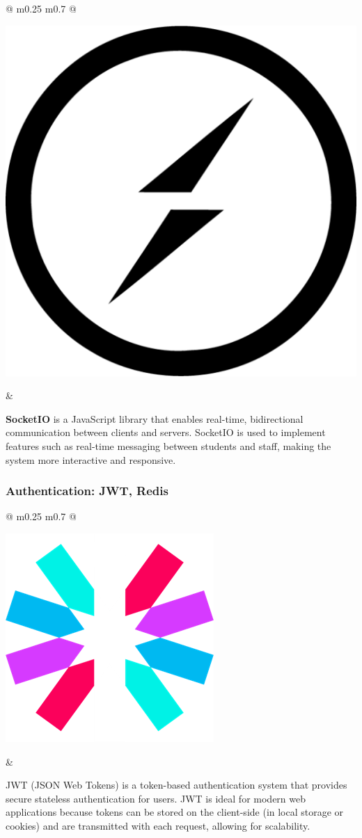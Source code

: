 	\vspace*{0.5cm}
	\begin{tabular}{ @{} m{0.25\textwidth} m{0.7\textwidth} @{} }
		\begin{minipage}{\linewidth}
			\centering
			\includegraphics[width=0.45\linewidth]{graphics/socket-io.512x512.png}
			\label{fig:socketio}
		\end{minipage}
		&
		\begin{minipage}{\linewidth}
			\textbf{SocketIO} is a JavaScript library that enables real-time, bidirectional communication between clients and servers. SocketIO is used to implement features such as real-time messaging between students and staff, making the system more interactive and responsive. \cite{socketio}
		\end{minipage}
	\end{tabular}
	
	
	\subsubsection{Authentication: JWT, Redis}
	\vspace*{0.5cm}
	\begin{tabular}{ @{} m{0.25\textwidth} m{0.7\textwidth} @{} }
		\begin{minipage}{\linewidth}
			\centering
			\includegraphics[width=0.5\linewidth]{graphics/jwt-logo.png}
			\label{fig:jwt }
		\end{minipage}
		&
		\begin{minipage}{\linewidth}
			JWT (JSON Web Tokens) is a token-based authentication system that provides secure stateless authentication for users. JWT is ideal for modern web applications because tokens can be stored on the client-side (in local storage or cookies) and are transmitted with each request, allowing for scalability.
		\end{minipage}
	\end{tabular}
	
